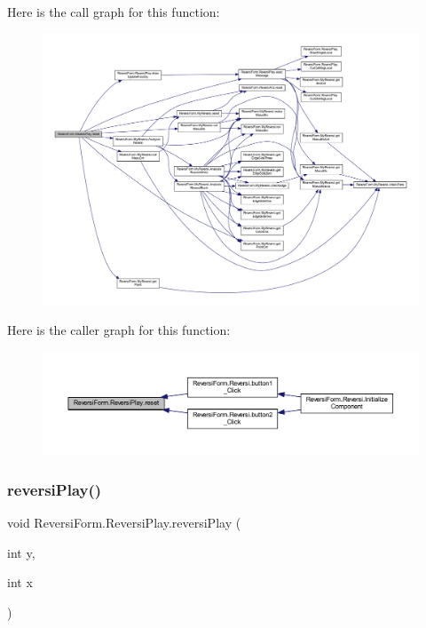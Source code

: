 Here is the call graph for this function\+:\nopagebreak
\begin{figure}[H]
\begin{center}
\leavevmode
\includegraphics[width=350pt]{class_reversi_form_1_1_reversi_play_a03997d634aa21a84e660e7f98aa27064_cgraph}
\end{center}
\end{figure}
Here is the caller graph for this function\+:\nopagebreak
\begin{figure}[H]
\begin{center}
\leavevmode
\includegraphics[width=350pt]{class_reversi_form_1_1_reversi_play_a03997d634aa21a84e660e7f98aa27064_icgraph}
\end{center}
\end{figure}
\mbox{\label{class_reversi_form_1_1_reversi_play_a7f3822227e59fac0f998927a6566006e}} 
\subsubsection{\texorpdfstring{reversi\+Play()}{reversiPlay()}}
{\footnotesize\ttfamily void Reversi\+Form.\+Reversi\+Play.\+reversi\+Play (\begin{DoxyParamCaption}\item[{int}]{y,  }\item[{int}]{x }\end{DoxyParamCaption})}



